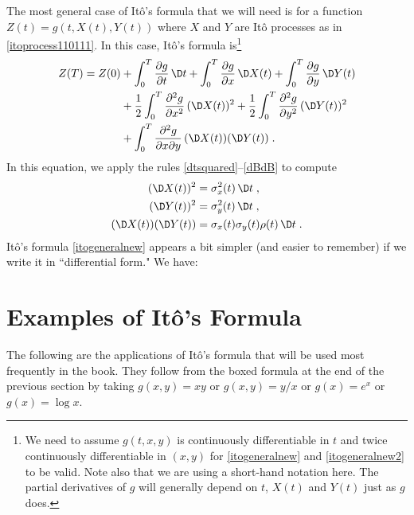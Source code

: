 The most general case of It\^o's formula that we will need is for a function $Z(t) = g(t, X(t), Y(t))$ where $X$ and $Y$ are It\^o processes as in \eqref{itoprocess110111}.  In this case, It\^o's formula is\footnote{We need to assume $g(t,x,y)$ is continuously differentiable in $t$ and twice continuously differentiable in $(x,y)$ for \eqref{itogeneralnew} and \eqref{itogeneralnew2} to be valid.  Note also that we are using a short-hand notation here.  The partial derivatives of $g$ will generally depend on $t$, $X(t)$ and $Y(t)$ just as $g$ does.}
\begin{align}
Z(T) = Z(0) &+ \int_0^T \frac{\partial g}{\partial t}\,\D t + \int_0^T \frac{\partial g}{\partial x}\,\D X(t) + \int_0^T \frac{\partial g}{\partial y}\,\D Y(t) \notag\\
&+ \frac{1}{2} \int_0^T \frac{\partial^2 g}{\partial x^2}\,(\D X(t))^2 +  \frac{1}{2} \int_0^T \frac{\partial^2 g}{\partial y^2}\,(\D Y(t))^2\notag \\
&+  \int_0^T \frac{\partial^2 g}{\partial x\partial y}\,(\D X(t))( \D Y(t))\;.\label{itogeneralnew}
\end{align}
In this equation, we apply the rules \eqref{dtsquared}--\eqref{dBdB} to compute
\begin{align*}
(\D X(t))^2&= \sigma_x^2(t)\,\D t\; ,\\
(\D Y(t))^2 &= \sigma_y^2(t)\,\D t\; ,\\
(\D X(t))( \D Y(t)) &= \sigma_x(t)\sigma_y(t)\rho(t)\,\D t\;.
\end{align*}
It\^o's formula \eqref{itogeneralnew} appears a bit simpler (and easier to remember) if we write it in ``differential form."  We have:


\section{Examples of It\^o's Formula}\label{s_examples}
The following are the applications of It\^o's formula that will be used most frequently in the book.  They follow from the boxed formula at the end of the previous section by taking $g(x,y)=xy$ or $g(x,y)=y/x$ or $g(x)=e^x$ or $g(x) = \log x$.



